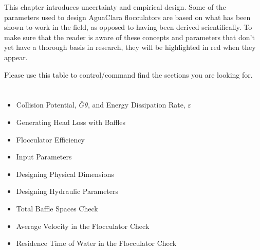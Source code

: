 \documentclass[letterpaper,10pt,english]{sphinxmanual}
\begin{document}
 This chapter introduces uncertainty and empirical design. Some of the parameters used to design AguaClara flocculators are based on what has been shown to work in the field, as opposed to having been derived scientifically. To make sure that the reader is aware of these concepts and parameters that don’t yet have a thorough basis in research, they will be highlighted in red when they appear.

Please use this table to control/command find the sections you are looking for.


\section{}
\label{\detokenize{Flocculation/Floc_Design:section-hydraulic-flocculators-the-aguaclara-approach}}
\begin{itemize}
\item {} 
Collision Potential, \(\bar G \theta\), and Energy Dissipation Rate, \(\varepsilon\)

\item {} 
Generating Head Loss with Baffles

\item {} 
Flocculator Efficiency

\end{itemize}

\begin{itemize}
\item {} 
Input Parameters

\item {} 
Designing Physical Dimensions

\item {} 
Designing Hydraulic Parameters

\end{itemize}

\begin{itemize}
\item {} 
Total Baffle Spaces Check

\item {} 
Average Velocity in the Flocculator Check

\item {} 
Residence Time of Water in the Flocculator Check

\end{itemize}
\end{document}
